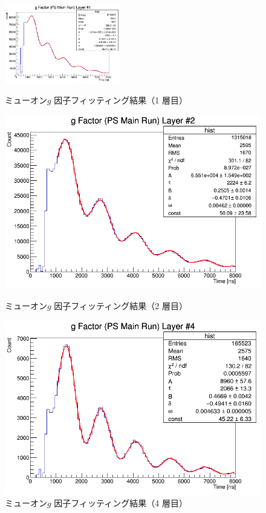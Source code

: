 \begin{figure}[h]
	\centering
	\includegraphics[width = 0.45\textwidth]{figure/odagawa/PSgFactorFit_Layer0.png}
	\caption{ミューオン$g$ 因子フィッティング結果（1 層目）}
	\label{fig:PSgFactorFit_Layer0}
	\begin{minipage}{0.45\textwidth}
	\centering
	\includegraphics[width = \textwidth]{figure/odagawa/PSgFactorFit_Layer1.png}
	\caption{ミューオン$g$ 因子フィッティング結果（2 層目）}
	\label{fig:PSgFactorFit_Layer1}
	\end{minipage}
	\begin{minipage}{0.45\textwidth}
	\centering
	\includegraphics[width = \textwidth]{figure/odagawa/PSgFactorFit_Layer3.png}
	\caption{ミューオン$g$ 因子フィッティング結果（4 層目）}
	\label{fig:PSgFactorFit_Layer3}
	\end{minipage}
\end{figure}%

